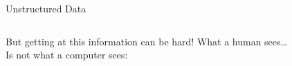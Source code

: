 \documentclass[10pt]{beamer}
\begin{document}
\begin{frame}{Unstructured Data}
\begin{columns}
\begin{column}{0.4\textwidth}
  But getting at this information can be hard! What a human sees\ldots
  \\ \vspace{5em}
  Is not what a computer sees:
\end{column}
\begin{column}{0.6\textwidth}
\begin{center}
\end{center}
\end{column}
\end{columns}
\end{frame}
\end{document}
